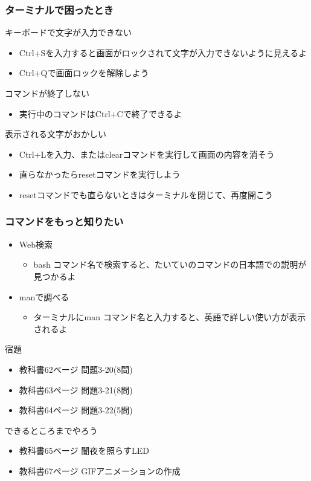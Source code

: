 \begin{frame}
    \frametitle{ターミナルで困ったとき}
    キーボードで文字が入力できない
    \begin{itemize}
        \item Ctrl+Sを入力すると画面がロックされて文字が入力できないように見えるよ
        \item Ctrl+Qで画面ロックを解除しよう
    \end{itemize}
    コマンドが終了しない
    \begin{itemize}
        \item 実行中のコマンドはCtrl+Cで終了できるよ
    \end{itemize}
    表示される文字がおかしい
    \begin{itemize}
        \item Ctrl+Lを入力、またはclearコマンドを実行して画面の内容を消そう
        \item 直らなかったらresetコマンドを実行しよう
        \item resetコマンドでも直らないときはターミナルを閉じて、再度開こう
    \end{itemize}
\end{frame}

\begin{frame}
    \frametitle{コマンドをもっと知りたい}
    \begin{itemize}
        \item Web検索
        \begin{itemize}
            \item bash コマンド名で検索すると、たいていのコマンドの日本語での説明が見つかるよ
        \end{itemize}
        \item manで調べる
        \begin{itemize}
            \item ターミナルにman コマンド名と入力すると、英語で詳しい使い方が表示されるよ
        \end{itemize}
    \end{itemize}
\end{frame}

\begin{frame}
    \begin{exampleblock}{宿題}
        \begin{itemize}
            \item 教科書62ページ 問題3-20(8問)
            \item 教科書63ページ 問題3-21(8問)
            \item 教科書64ページ 問題3-22(5問)
            \end{itemize}
    \end{exampleblock} 
    \begin{block}{できるところまでやろう}
        \begin{itemize}
            \item 教科書65ページ 闇夜を照らすLED
            \item 教科書67ページ GIFアニメーションの作成
        \end{itemize}
    \end{block} 
\end{frame}
